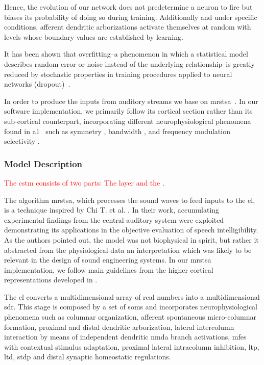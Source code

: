 \documentclass[10pt,letterpaper]{article}
\begin{document}
Hence, the evolution of our network does not predetermine a neuron to fire but biases its probability of doing so during training. Additionally and under specific conditions, afferent dendritic arborizations activate themselves at random with levels whose boundary values are established by learning. 

It has been shown that overfitting--a phenomenon in which a statistical model describes random error or noise instead of the underlying relationship--is greatly reduced by stochastic properties in training procedures applied to neural networks (dropout)~\cite{JMLR:v15:srivastava14a}.

In order to produce the inputs from auditory streams we base on \gls{mrstsa}~\cite{chi_2005}. In our software implementation, we primarily follow its cortical section rather than its sub-cortical counterpart, incorporating different neurophysiological phenomena found in \gls{a1}~\cite{wang_1995} such as symmetry \cite{shamma_1993}, bandwidth \cite{schreiner_1990}, and frequency modulation selectivity \cite{shamma_1993,heil_1992,mendelson_1985}.








\subsubsection*{Model Description}
\label{model-description}

\textcolor{red}{The \gls{cstm} consists of two parts: The  layer and the }.

The algorithm \gls{mrstsa}, which processes the sound waves to feed inputs to the \gls{el}, is a technique inspired by Chi T. et al. \cite{chi_2005}. In their work, accumulating experimental findings from the central auditory system were exploited demonstrating its applications in the objective evaluation of speech intelligibility. As the authors pointed out, the model was not biophysical in spirit, but rather it abstracted from the physiological data an interpretation which was likely to be relevant in the design of sound engineering systems. In our \gls{mrstsa} implementation, we follow main guidelines from the higher cortical representations developed in \cite{chi_2005}.

The \gls{el} converts a multidimensional array of real numbers into a multidimensional \gls{sdr}. This stage is composed by a set of \glspl{som} \cite{kohonen_2082, Kohonen:1989:SAM:69371} and incorporates neurophysiological phenomena such as columnar organization, afferent spontaneous micro-columnar formation, proximal and distal dendritic arborization, lateral intercolumn interaction by means of independent dendritic \gls{nmda} branch activations, \glspl{mfe} with contextual stimulus adaptation, proximal lateral intracolumn inhibition, \gls{ltp}, \gls{ltd}, \gls{stdp} and distal synaptic homeostatic regulations.
\end{document}
